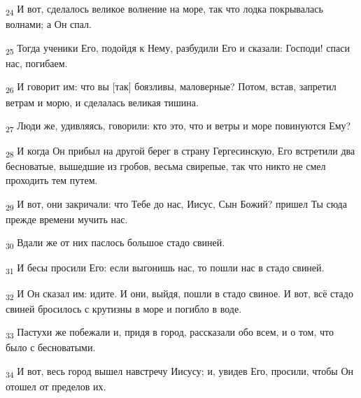 \begin{tcolorbox}
\textsubscript{24} И вот, сделалось великое волнение на море, так что лодка покрывалась волнами; а Он спал.
\end{tcolorbox}
\begin{tcolorbox}
\textsubscript{25} Тогда ученики Его, подойдя к Нему, разбудили Его и сказали: Господи! спаси нас, погибаем.
\end{tcolorbox}
\begin{tcolorbox}
\textsubscript{26} И говорит им: что вы [так] боязливы, маловерные? Потом, встав, запретил ветрам и морю, и сделалась великая тишина.
\end{tcolorbox}
\begin{tcolorbox}
\textsubscript{27} Люди же, удивляясь, говорили: кто это, что и ветры и море повинуются Ему?
\end{tcolorbox}
\begin{tcolorbox}
\textsubscript{28} И когда Он прибыл на другой берег в страну Гергесинскую, Его встретили два бесноватые, вышедшие из гробов, весьма свирепые, так что никто не смел проходить тем путем.
\end{tcolorbox}
\begin{tcolorbox}
\textsubscript{29} И вот, они закричали: что Тебе до нас, Иисус, Сын Божий? пришел Ты сюда прежде времени мучить нас.
\end{tcolorbox}
\begin{tcolorbox}
\textsubscript{30} Вдали же от них паслось большое стадо свиней.
\end{tcolorbox}
\begin{tcolorbox}
\textsubscript{31} И бесы просили Его: если выгонишь нас, то пошли нас в стадо свиней.
\end{tcolorbox}
\begin{tcolorbox}
\textsubscript{32} И Он сказал им: идите. И они, выйдя, пошли в стадо свиное. И вот, всё стадо свиней бросилось с крутизны в море и погибло в воде.
\end{tcolorbox}
\begin{tcolorbox}
\textsubscript{33} Пастухи же побежали и, придя в город, рассказали обо всем, и о том, что было с бесноватыми.
\end{tcolorbox}
\begin{tcolorbox}
\textsubscript{34} И вот, весь город вышел навстречу Иисусу; и, увидев Его, просили, чтобы Он отошел от пределов их.
\end{tcolorbox}
